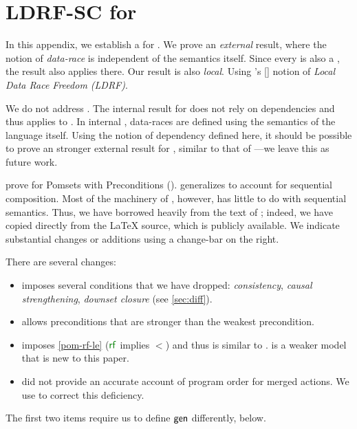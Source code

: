 \section{LDRF-SC for \PwTmcaTITLE{}}
\label{sec:sc}

\begin{changed}
  In this appendix, we establish a \drfsc{} for .  We prove an
  \emph{external} result, where the notion of \emph{data-race} is independent
  of the semantics itself.  Since every  is also a , the
  result also applies there.  Our result is also \emph{local}.  Using
  \citeauthor{Dolan:2018:BDR:3192366.3192421}'s
  [\citeyear{Dolan:2018:BDR:3192366.3192421}] notion of \emph{Local Data Race
    Freedom (LDRF)}.

  We do not address \PwTc{}.  The internal \drfsc{} result for \cXI{}
  \cite{DBLP:phd/ethos/Batty15} does not rely on dependencies and thus
  applies to \PwTc{}.  In internal \drfsc{}, data-races are defined using the
  semantics of the language itself.  Using the notion of dependency defined
  here, it should be possible to prove an stronger external result for
  \cXI{}, similar to that of \cite{DBLP:conf/pldi/LahavVKHD17}---we leave
  this as future work.

  \citet{DBLP:journals/pacmpl/JagadeesanJR20} prove \ldrfsc{} for Pomsets
  with Preconditions (\PwP{}).  \PwTmca{} generalizes \PwP{} to account for
  sequential composition.  Most of the machinery of \ldrfsc{}, however, has
  little to do with sequential semantics.  Thus, we have borrowed heavily
  from the text of \cite{DBLP:journals/pacmpl/JagadeesanJR20}; indeed, we
  have copied directly from the \LaTeX{} source, which is publicly available.
  We indicate substantial changes or additions using a change-bar on the
  right.

  There are several changes:
  \begin{itemize}
  \item \PwP{} imposes several conditions that we have dropped:
    \emph{consistency}, \emph{causal strengthening}, \emph{downset closure}
    (see \textsection\ref{sec:diff}).
  \item \PwP{} allows preconditions that are stronger than the weakest precondition.
  \item \PwP{} imposes \ref{pom-rf-le} ($\rrfx$ implies $\lt$) and thus is
    similar to .   is a weaker model that is new to this
    paper.  %
  \item \PwP{} did not provide an accurate account of program order for
    merged actions.  We use  to correct this deficiency.
  \end{itemize}
  The first two items require us to define $\semmin{}$ differently, below.
\end{changed}

